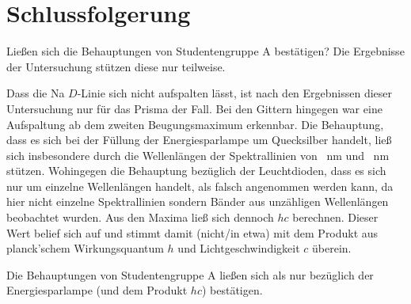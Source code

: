 \section{Schlussfolgerung}
	
	Ließen sich die Behauptungen von Studentengruppe A bestätigen?
	Die Ergebnisse der Untersuchung stützen diese nur teilweise.
	
	Dass die Na $D$-Linie sich nicht aufspalten lässt, ist nach den Ergebnissen dieser Untersuchung nur für das Prisma der Fall.
	Bei den Gittern hingegen war eine Aufspaltung ab dem zweiten Beugungsmaximum erkennbar.
	Die Behauptung, dass es sich bei der Füllung der Energiesparlampe um Quecksilber handelt, ließ sich insbesondere durch die Wellenlängen der Spektrallinien von \SI{}{\nano\meter} und \SI{}{\nano\meter} stützen.
	Wohingegen die Behauptung bezüglich der Leuchtdioden, dass es sich nur um einzelne Wellenlängen handelt, als falsch angenommen werden kann, da hier nicht einzelne Spektrallinien sondern Bänder aus unzähligen Wellenlängen beobachtet wurden. 
	Aus den Maxima ließ sich dennoch $hc$ berechnen.
	Dieser Wert belief sich auf \SI{}{} und stimmt damit (nicht/in etwa) mit dem Produkt aus planck'schem Wirkungsquantum $h$ und Lichtgeschwindigkeit $c$ überein.
	
	Die Behauptungen von Studentengruppe A ließen sich als nur bezüglich der Energiesparlampe (und dem Produkt $hc$) bestätigen.